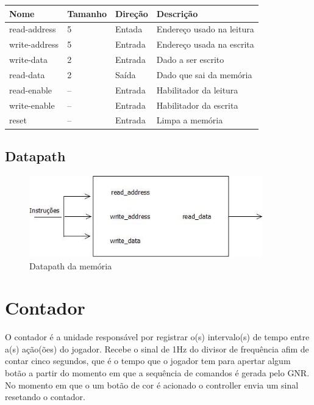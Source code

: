 \documentclass{report}
\begin{document}
      \begin{table}[H]
       \centering
        \begin{tabular}[pos]{|m{2cm} |m{2cm}| m{6cm} | m{3cm}|} 
         \hline
          \cellcolor[gray]{0.9}
           \textbf{Nome} & \cellcolor[gray]{0.9} \textbf{Tamanho}  &\cellcolor[gray]{0.9}\textbf{Direção} & \cellcolor[gray]{0.9}\textbf{Descrição}\\ \hline
                read-address & 5 & Entada & Endereço usado na leitura\\ \hline
                write-address & 5 & Entrada & Endereço usada na escrita  \\ \hline
                write-data & 2 & Entrada & Dado a ser escrito \\ \hline
                read-data & 2 & Saída & Dado que sai da memória \\ \hline
                read-enable & -- & Entrada & Habilitador da leitura \\ \hline
                write-enable & -- & Entrada & Habilitador da escrita \\ \hline
                reset & -- & Entrada & Limpa a memória \\ \hline
        \end{tabular}
       \end{table}
    
    \subsection{Datapath}
    
    \begin{figure}[H] \centering \includegraphics[width=0.9\textwidth]{memo.jpg} \caption{Datapath da memória} \label{fig:mesh1} \end{figure}
    
  \section{Contador}
  
  O contador é a unidade responsável por registrar o(s) intervalo(s) de tempo entre a(s) ação(ões) do jogador. Recebe o sinal de 1Hz do divisor de frequência afim de contar cinco segundos, que é o tempo que o jogador tem para apertar algum botão a partir do momento em que a sequência de comandos é gerada pelo GNR. No momento em que o um botão de cor é acionado o controller envia um sinal resetando o contador.
  
\end{document}
